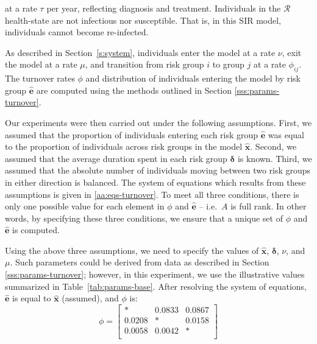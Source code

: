 at a rate $\tau$ per year, reflecting diagnosis and treatment.
Individuals in the $\mathcal{R}$ health-state are not infectious nor susceptible.
That is, in this SIR model, individuals cannot become re-infected.
\par
As described in Section~\ref{s:system}, individuals
enter the model at a rate $\nu$,
exit the model at a rate $\mu$,
and transition from risk group $i$ to group $j$ at a rate $\phi_{ij}$.
The turnover rates $\phi$ and
distribution of individuals entering the model by risk group $\bm{\hat{e}}$
are computed using the methods outlined in
Section \ref{sss:params-turnover}.
\par
Our experiments were then carried out under the following assumptions.
First, we assumed that
the proportion of individuals entering each risk group $\bm{\hat{e}}$
was equal to the proportion of individuals across risk groups in the model $\bm{\hat{x}}$.
Second, we assumed that
the average duration spent in each risk group $\bm{\delta}$ is known.
Third, we assumed that
the absolute number of individuals moving between two risk groups in either direction is balanced.
The system of equations which results from these assumptions
is given in \ref{aa:eqs-turnover}.
To meet all three conditions, there is only one possible value
for each element in $\phi$ and $\bm{\hat{e}}$
-- i.e.\ $A$ is full rank.
In other words, by specifying these three conditions,
we ensure that a unique set of $\phi$ and $\bm{\hat{e}}$ is computed.
\par
Using the above three assumptions,
we need to specify the values of $\bm{\hat{x}}$, $\bm{\delta}$, $\nu$, and $\mu$.
Such parameters could be derived from data as described in Section \ref{sss:params-turnover};
however, in this experiment, we use the illustrative values summarized in
Table~\ref{tab:params-base}.
After resolving the system of equations,
$\bm{\hat{e}}$ is equal to $\bm{\hat{x}}$ (assumed), and $\phi$ is:
\begin{equation} %
\phi = \left[\begin{array}{ccc}
*      & 0.0833 & 0.0867 \\
0.0208 & *      & 0.0158 \\
0.0058 & 0.0042 & *      \\
\end{array}\right]
\end{equation}
